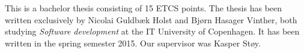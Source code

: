 This is a bachelor thesis consisting of 15 ETCS points.
The thesis has been written exclusively by Nicolai Guldbæk Holst and Bjørn Hasager Vinther, both studying \textit{Software development} at the IT University of Copenhagen.  It has been written in the spring semester 2015. Our supervisor was Kasper Støy. 